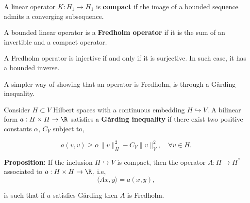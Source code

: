 \begin{definition}
    A linear operator $K:H_1 \to H_1$ is \textbf{compact} if the image of a bounded sequence admits a converging subsequence.
\end{definition}
\begin{definition}
    A bounded linear operator is a \textbf{Fredholm operator} if it is the sum of an invertible and a compact operator. 
\end{definition}

\begin{theorem}
    A Fredholm operator is injective if and only if it is surjective. In such case, it has a bounded inverse.
\end{theorem}

A simpler way of showing that an operator is Fredholm, is through a Gårding inequality.

\begin{definition}
    Consider $H\subset V$ Hilbert spaces with a continuous embedding $H\hookrightarrow V$. 
    A bilinear form $a:H\times H\to \R$ satisfies a \textbf{Gårding inequality} if there exist two positive constants $\alpha$, $C_V$ subject to, 
    
    \[a(v,v) \geq \alpha \|v\|^2_H - C_V\|v\|^2_V,\quad \forall v\in H.\]
\end{definition}

\textbf{Proposition:}
 If the inclusion $H\hookrightarrow V$ is compact, then the operator $A: H\to H^*$ associated to $a:H\times H\to \R$, i.e,
 \[\langle Ax,y\rangle = a(x,y),\]

 is such that if $a$ satisfies Gårding then $A$ is Fredholm. 

